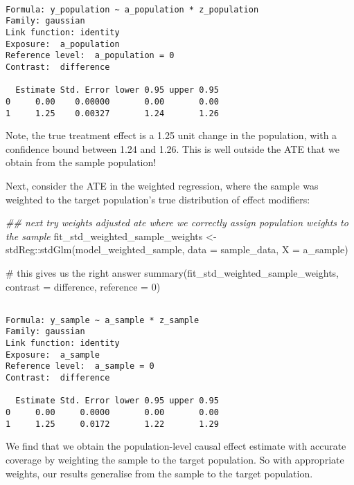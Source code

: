 \documentclass[
  single column]{article}
\newenvironment{Shaded}{\begin{snugshade}}{\end{snugshade}}
\newcommand{\AttributeTok}[1]{\textcolor[rgb]{0.40,0.45,0.13}{#1}}
\newcommand{\CommentTok}[1]{\textcolor[rgb]{0.37,0.37,0.37}{#1}}
\newcommand{\DecValTok}[1]{\textcolor[rgb]{0.68,0.00,0.00}{#1}}
\newcommand{\DocumentationTok}[1]{\textcolor[rgb]{0.37,0.37,0.37}{\textit{#1}}}
\newcommand{\FunctionTok}[1]{\textcolor[rgb]{0.28,0.35,0.67}{#1}}
\newcommand{\NormalTok}[1]{\textcolor[rgb]{0.00,0.23,0.31}{#1}}
\newcommand{\OtherTok}[1]{\textcolor[rgb]{0.00,0.23,0.31}{#1}}
\newcommand{\SpecialCharTok}[1]{\textcolor[rgb]{0.37,0.37,0.37}{#1}}
\newcommand{\StringTok}[1]{\textcolor[rgb]{0.13,0.47,0.30}{#1}}
\begin{document}
\begin{verbatim}

Formula: y_population ~ a_population * z_population
Family: gaussian 
Link function: identity 
Exposure:  a_population 
Reference level:  a_population = 0 
Contrast:  difference 

  Estimate Std. Error lower 0.95 upper 0.95
0     0.00    0.00000       0.00       0.00
1     1.25    0.00327       1.24       1.26
\end{verbatim}

Note, the true treatment effect is a 1.25 unit change in the population,
with a confidence bound between 1.24 and 1.26. This is well outside the
ATE that we obtain from the sample population!

Next, consider the ATE in the weighted regression, where the sample was
weighted to the target population's true distribution of effect
modifiers:

\begin{Shaded}
\begin{Highlighting}[]
\DocumentationTok{\#\# next try weights adjusted ate where we correctly assign population weights to the sample}
\NormalTok{fit\_std\_weighted\_sample\_weights }\OtherTok{\textless{}{-}}\NormalTok{ stdReg}\SpecialCharTok{::}\FunctionTok{stdGlm}\NormalTok{(model\_weighted\_sample, }
  \AttributeTok{data =}\NormalTok{ sample\_data, }\AttributeTok{X =} \StringTok{\textquotesingle{}a\_sample\textquotesingle{}}\NormalTok{)}

\CommentTok{\# this gives us the right answer}
\FunctionTok{summary}\NormalTok{(fit\_std\_weighted\_sample\_weights, }\AttributeTok{contrast =} \StringTok{\textquotesingle{}difference\textquotesingle{}}\NormalTok{, }\AttributeTok{reference =} \DecValTok{0}\NormalTok{)}
\end{Highlighting}
\end{Shaded}

\begin{verbatim}

Formula: y_sample ~ a_sample * z_sample
Family: gaussian 
Link function: identity 
Exposure:  a_sample 
Reference level:  a_sample = 0 
Contrast:  difference 

  Estimate Std. Error lower 0.95 upper 0.95
0     0.00     0.0000       0.00       0.00
1     1.25     0.0172       1.22       1.29
\end{verbatim}

We find that we obtain the population-level causal effect estimate with
accurate coverage by weighting the sample to the target population. So
with appropriate weights, our results generalise from the sample to the
target population.
\end{document}

